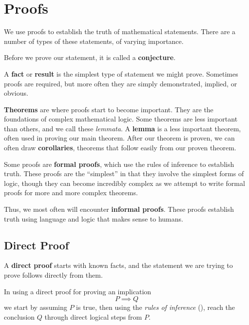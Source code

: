 \chapter{Proofs}
We use proofs to establish the truth of mathematical statements.
There are a number of types of these statements, of varying importance.

Before we prove our statement, it is called a
\textbf{conjecture}.

A \textbf{fact} or \textbf{result} is the simplest type of statement we might
prove. Sometimes proofs are required, but more often they are simply
demonstrated, implied, or obvious.

\textbf{Theorems} are where proofs start to become important. They are the
foundations of complex mathematical logic. Some theorems are
less important than others, and we call these \emph{lemmata}. A
\textbf{lemma} is a less important theorem, often used in proving
our main theorem. After our theorem is proven, we can often draw
\textbf{corollaries}, theorems that follow
easily from our proven theorem.

Some proofs are \textbf{formal proofs}, which use the rules of inference to
establish truth. These proofs are the ``simplest'' in that they involve the
simplest forms of logic, though they can become incredibly complex as we attempt
to write formal proofs for more and more complex theorems.

Thus, we most often will encounter \textbf{informal proofs}.
These proofs establish truth using language and logic that makes sense to humans.

\section{Direct Proof}

A \textbf{direct proof} starts with known facts, and the statement we are trying
to prove follows directly from them.

In using a direct proof for proving an implication \[P \implies Q\]
we start by assuming $P$ is true, then using the \emph{rules of inference}
(),
reach the conclusion $Q$ through direct logical steps from $P$.

